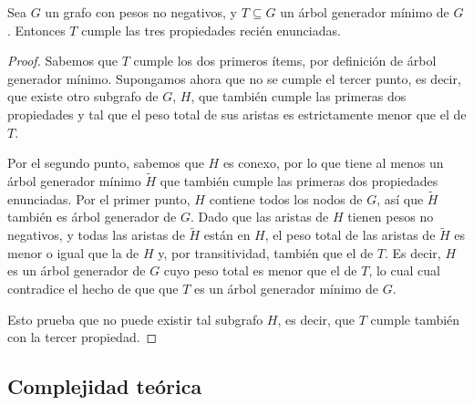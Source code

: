     \begin{lema}
    Sea $G$ un grafo con pesos no negativos, y $T \subseteq G$ un árbol
    generador mínimo de $G$. Entonces $T$ cumple las tres propiedades recién
    enunciadas.
    \end{lema}
    \begin{proof}
    Sabemos que $T$ cumple los dos primeros ítems, por definición de árbol
    generador mínimo.
    Supongamos ahora que no se cumple el tercer punto, es decir, que existe
    otro subgrafo de $G$, $H$, que también cumple las primeras dos propiedades
    y tal que el peso total de sus aristas es estrictamente menor que el de
    $T$.

    Por el segundo punto, sabemos que $H$ es conexo, por lo que tiene al menos
    un árbol generador mínimo $\tilde{H}$ que también cumple las primeras dos
    propiedades enunciadas. Por el primer punto, $H$ contiene todos los
    nodos de $G$, así que $\tilde{H}$ también es árbol generador de $G$.
    Dado que las aristas de $H$ tienen pesos no negativos, y todas las aristas
    de $\tilde{H}$ están en $H$, el peso total de las aristas de $\tilde{H}$
    es menor o igual que la de $H$ y, por transitividad, también que el de
    $T$. Es decir, $H$ es un árbol generador de $G$ cuyo peso total es menor
    que el de $T$, lo cual cual contradice el hecho de que que $T$ es un árbol
    generador mínimo de $G$.

    Esto prueba que no puede existir tal subgrafo $H$, es decir, que $T$
    cumple también con la tercer propiedad.
    \end{proof}

    \subsection{Complejidad teórica}

